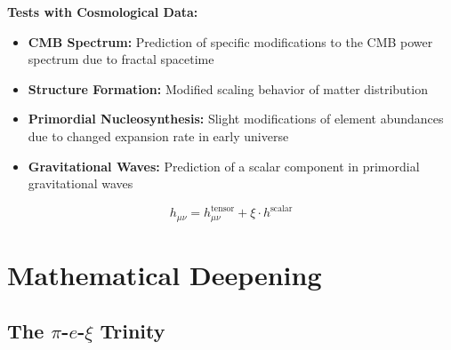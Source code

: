 \documentclass[12pt,a4paper]{article}
\newcommand{\xipar}{\xi}
\begin{document}
	\begin{application}
		\textbf{Tests with Cosmological Data:}
		
		\begin{itemize}
			\item \textbf{CMB Spectrum:} Prediction of specific modifications to the CMB power spectrum due to fractal spacetime
			
			\item \textbf{Structure Formation:} Modified scaling behavior of matter distribution
			
			\item \textbf{Primordial Nucleosynthesis:} Slight modifications of element abundances due to changed expansion rate in early universe
			
			\item \textbf{Gravitational Waves:} Prediction of a scalar component in primordial gravitational waves
		\end{itemize}
		
		\begin{equation}
			h_{\mu\nu} = h_{\mu\nu}^{\text{tensor}} + \xipar \cdot h^{\text{scalar}}
		\end{equation}
	\end{application}
	
	\section{Mathematical Deepening}
	
	\subsection{The $\pi$-$e$-$\xi$ Trinity}
	
\end{document}
